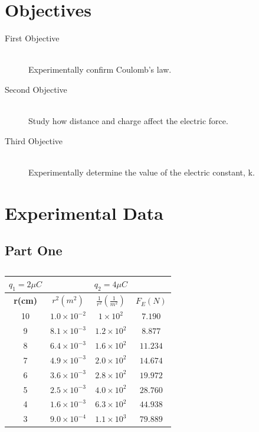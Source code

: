 \documentclass{article}
\begin{document}
\section{Objectives}


\begin{description}
	\item[First Objective] \hfill \\
		Experimentally confirm Coulomb's law.
	\item[Second Objective] \hfill \\
		Study how distance and charge affect the electric force.
	\item[Third Objective] \hfill \\
		Experimentally determine the value of the electric constant, k.
\end{description}



\section{Experimental Data}

\subsection{Part One}%
\label{sub:part_one}


\begin{table}[htpb]
	\centering
	\caption{}
	\label{tab:label}
	\begin{tabular}{| c |  c | c |  c | }
		\hline
		$q_1= 2 \mu C$ & &  $q_2 = 4 \mu C$  &\\
		\hline
		\textbf{r(cm)} & \textbf{$r^2(m^2)$} & $\frac{1}{r^2}(\frac{1}{m^2})$ & $F_{E}(N)$ \\
		\hline
		10 & $1.0 \times 10^{-2}$ & $1\times 10^{2}$& $7.190$ \\
		\hline
		9 & $8.1 \times  10^{-3}$& $1.2 \times 10^{2}$ & $8.877$\\
		\hline
		8 & $6.4 \times 10^{-3}$& $1.6 \times 10^{2}$ & $11.234$\\
		\hline
		7 & $4.9 \times  10^{-3}$& $2.0 \times  10^{2}$ & $14.674$ \\
		\hline
		6 & $3.6 \times 10^{-3}$& $2.8 \times 10^{2}$& $19.972$\\
		\hline
		5 & $2.5 \times 10^{-3}$ & $4.0 \times  10^2$& $28.760$ \\
		\hline
		4 & $1.6 \times  10^{-3}$& $6.3 \times  10^2$ & $44.938$ \\
		\hline
		3 & $9.0 \times  10^{-4}$& $1.1 \times  10^{3}$ & $ 79.889$\\
		\hline
	\end{tabular}
\end{table}
\end{document}

